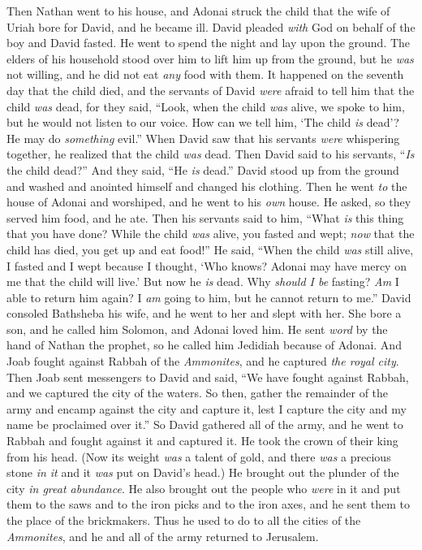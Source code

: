 \begin{biblechapter}
\verse Then Nathan went to his house, and Adonai struck the child that the wife of Uriah bore for David, and he became ill.
\verse David pleaded \textit{with} God on behalf of the boy and David fasted. He went to spend the night and lay upon the ground.
\verse The elders of his household stood over him to lift him up from the ground, but he \textit{was} not willing, and he did not eat \textit{any} food with them.
\verse It happened on the seventh day that the child died, and the servants of David \textit{were} afraid to tell him that the child \textit{was} dead, for they said, “Look, when the child \textit{was} alive, we spoke to him, but he would not listen to our voice. How can we tell him, ‘The child \textit{is} dead’? He may do \textit{something} evil.”
\verse When David saw that his servants \textit{were} whispering together, he realized that the child \textit{was} dead. Then David said to his servants, “\textit{Is} the child dead?” And they said, “He \textit{is} dead.”
\verse David stood up from the ground and washed and anointed himself and changed his clothing. Then he went \textit{to} the house of Adonai and worshiped, and he went to his \textit{own} house. He asked, so they served him food, and he ate.
\verse Then his servants said to him, “What \textit{is} this thing that you have done? While the child \textit{was} alive, you fasted and wept; \textit{now} that the child has died, you get up and eat food!”
\verse He said, “When the child \textit{was} still alive, I fasted and I wept because I thought, ‘Who knows? Adonai may have mercy on me that the child will live.’
\verse But now he \textit{is} dead. Why \textit{should I be} fasting? \textit{Am} I able to return him again? I \textit{am} going to him, but he cannot return to me.”
\verse David consoled Bathsheba his wife, and he went to her and slept with her. She bore a son, and he called him Solomon, and Adonai loved him.
\verse He sent \textit{word} by the hand of Nathan the prophet, so he called him Jedidiah because of Adonai.
 And Joab fought against Rabbah of the \textit{Ammonites}, and he captured \textit{the royal city}.
\verse Then Joab sent messengers to David and said, “We have fought against Rabbah, and we captured the city of the waters.
\verse So then, gather the remainder of the army and encamp against the city and capture it, lest I capture the city and my name be proclaimed over it.”
\verse So David gathered all of the army, and he went to Rabbah and fought against it and captured it.
\verse He took the crown of their king from his head. (Now its weight \textit{was} a talent of gold, and there \textit{was} a precious stone \textit{in it} and it \textit{was} put on David’s head.) He brought out the plunder of the city \textit{in great abundance}.
\verse He also brought out the people who \textit{were} in it and put them to the saws and to the iron picks and to the iron axes, and he sent them to the place of the brickmakers. Thus he used to do to all the cities of the \textit{Ammonites}, and he and all of the army returned to Jerusalem.
\end{biblechapter}

